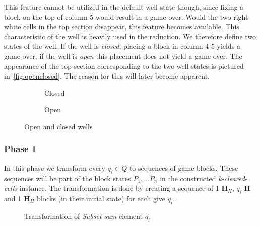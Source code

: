 This feature cannot be utilized in the default well state though, since fixing a block on the top of column 5 would result in a game over. Would the two right white cells in the top section disappear, this feature becomes available. This characteristic of the well is heavily used in the reduction. We therefore define two states of the well. If the well is \textit{closed}, placing a block in column 4-5 yields a game over, if the well is \textit{open} this placement does not yield a game over. The appearance of the top section corresponding to the two well states is pictured in~\autoref{fig:openclosed}. The reason for this will later become apparent.

\begin{figure}[H]
    \centering
    \begin{subfigure}[b]{0.15\linewidth}
        \caption{Closed}
    \end{subfigure}
    \hspace{0.02\linewidth}
    \begin{subfigure}[b]{0.15\linewidth}
        \caption{Open}
    \end{subfigure}
    \caption{Open and closed wells}
    \label{fig:openclosed}
\end{figure}

\subsubsection{Phase 1}
In this phase we transform every $q_i \in Q$ to sequences of game blocks. These sequences will be part of the block states $P_1, \ldots P_n$ in the constructed \textit{k-cleared-cells} instance. The transformation is done by creating a sequence of 1 $\mathbf{H}_{H}$, $q_i$ $\mathbf{H}$ and 1 $\mathbf{H}_H$ blocks (in their initial state) for each give $q_i$.

\begin{figure}[H]
    \centering
    \caption{Transformation of \textit{Subset sum} element $q_i$}
    \label{fig:wells}
\end{figure}
